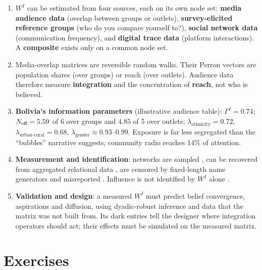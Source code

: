 \documentclass[../structural_economics_book.tex]{subfiles}
\begin{document}
\begin{enumerate}
\item $W^I$ can be estimated from four sources, each on its own node set: \textbf{media audience data} (overlap between groups or outlets), \textbf{survey-elicited reference groups} (who do you compare yourself to?), \textbf{social network data} (communication frequency), and \textbf{digital trace data} (platform interactions). A \textbf{composite} exists only on a common node set.

\item Media-overlap matrices are reversible random walks. Their Perron vectors are population shares (over groups) or reach (over outlets). Audience data therefore measure \textbf{integration} and the concentration of \textbf{reach}, not who is believed.

\item \textbf{Bolivia's information parameters} (illustrative audience table): $\Gamma^I = 0.74$; $N_{\text{eff}} = 5.59$ of 6 over groups and $4.85$ of 5 over outlets; $\lambda_{\text{ethnicity}} = 0.72$, $\lambda_{\text{urban-rural}} = 0.68$, $\lambda_{\text{gender}} \approx 0.93$--$0.99$. Exposure is far less segregated than the ``bubbles'' narrative suggests; community radio reaches 14\% of attention.

\item \textbf{Measurement and identification}: networks are sampled \citep{chandrasekhar2016econometrics}, can be recovered from aggregated relational data \citep{breza2020using}, are censored by fixed-length name generators \citep{griffith2022name} and misreported \citep{comola2014testing}. Influence is not identified by $W^I$ alone \citep{manski1993identification,bramoulle2009identification,shalizi2011homophily}.

\item \textbf{Validation and design}: a measured $W^I$ must predict belief convergence, aspirations and diffusion, using dyadic-robust inference and data that the matrix was not built from. Its dark entries tell the designer where integration operators should act; their effects must be simulated on the measured matrix.
\end{enumerate}


\section{Exercises}
\label{ch21:sec:exercises}
\end{document}
